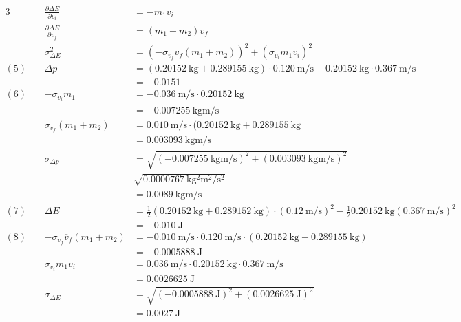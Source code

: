 \documentclass[12pt]{article}
\begin{document}
\begin{alignat*}{3}
            &&\frac{\partial \Delta E}{\partial v_i} &= -m_1v_i\\
            &&\frac{\partial \Delta E}{\partial v_f} &= (m_1+m_2)v_f\\
            &&\sigma^2_{\Delta E} &= (-\sigma_{v_f}\overline{v}_f(m_1+m_2))^2+(\sigma_{v_i}m_1\overline{v}_i)^2\\
            (5)~
            &&\Delta p &= (0.20152~\mathrm{kg}+0.289155~\mathrm{kg})\cdot0.120~\mathrm{m/s}-0.20152~\mathrm{kg} \cdot 0.367~\mathrm{m/s}\\
            &&&= -0.0151\\
            (6)~
            &&-\sigma_{v_i}m_1 &= -0.036~\mathrm{m/s}\cdot 0.20152~\mathrm{kg} \\
            &&& = -0.007255~\mathrm{kgm/s}\\
            && \sigma_{v_f} (m_1 + m_2) &= 0.010~\mathrm{m/s}\cdot (0.20152~\mathrm{kg}+0.289155~\mathrm{kg}\\
            &&& = 0.003093~\mathrm{kgm/s}\\
            &&\sigma_{\Delta p} &= \sqrt{(-0.007255~\mathrm{kgm/s})^2 + (0.003093~\mathrm{kgm/s})^2}\\
            &&&\sqrt{0.0000767~\mathrm{kg^2m^2/s^2}}\\
            &&& = 0.0089~\mathrm{kgm/s}\\
            (7)~
            &&\Delta E &= \frac{1}{2}(0.20152~\mathrm{kg} +0.289152~\mathrm{kg}) \cdot (0.12~\mathrm{m/s})^2-\frac{1}{2}0.20152~\mathrm{kg}(0.367~\mathrm{m/s})^2\\
            &&&=-0.010~\mathrm{J}\\
            (8)~
            && -\sigma_{v_f}\overline{v}_f(m_1+m_2) &= -0.010~\mathrm{m/s} \cdot 0.120~\mathrm{m/s} \cdot (0.20152~\mathrm{kg}+0.289155~\mathrm{kg})\\
            &&&= -0.0005888~\mathrm{J}\\
            &&\sigma_{v_i}m_1\overline{v}_i &= 0.036~\mathrm{m/s}\cdot 0.20152~\mathrm{kg}\cdot 0.367~\mathrm{m/s}\\
            &&&= 0.0026625~\mathrm{J}\\
            &&\sigma_{\Delta E} &= \sqrt{(-0.0005888~\mathrm{J})^2+(0.0026625~\mathrm{J})^2}\\
            &&&=0.0027~\mathrm{J}
        \end{alignat*}
\end{document}
